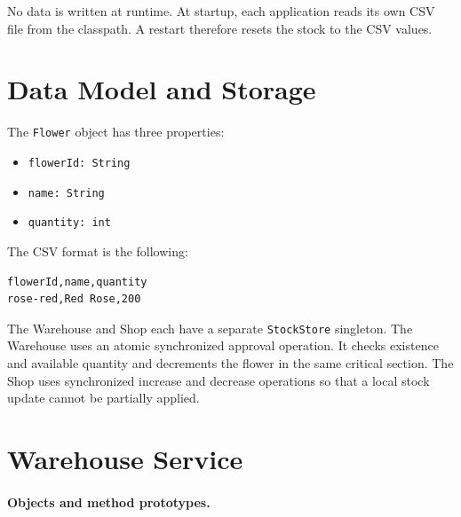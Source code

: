 \documentclass[12pt,a4paper]{article}
\begin{document}
No data is written at runtime. At startup, each application reads its own CSV
file from the classpath. A restart therefore resets the stock to the CSV
values.

\section{Data Model and Storage}

The \texttt{Flower} object has three properties:
\begin{itemize}
    \item \texttt{flowerId: String}
    \item \texttt{name: String}
    \item \texttt{quantity: int}
\end{itemize}

The CSV format is the following:
\begin{Verbatim}
flowerId,name,quantity
rose-red,Red Rose,200
\end{Verbatim}

The Warehouse and Shop each have a separate \texttt{StockStore} singleton.
The Warehouse uses an atomic synchronized approval operation. It checks
existence and available quantity and decrements the flower in the same
critical section. The Shop uses synchronized increase and decrease operations
so that a local stock update cannot be partially applied.

\section{Warehouse Service}

\paragraph{Objects and method prototypes.}
\end{document}
